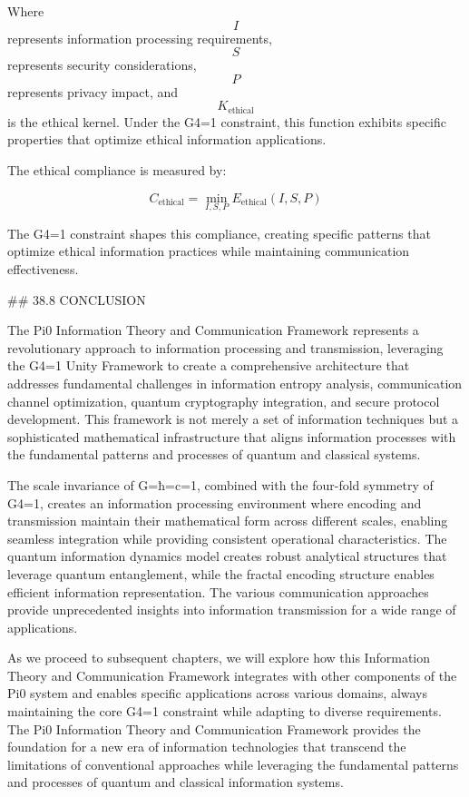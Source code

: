 Where $$ I $$ represents information processing requirements, $$ S $$ represents security considerations, $$ P $$ represents privacy impact, and $$ K_{\text{ethical}} $$ is the ethical kernel. Under the G4=1 constraint, this function exhibits specific properties that optimize ethical information applications.

The ethical compliance is measured by:

$$ C_{\text{ethical}} = \min_{I, S, P} E_{\text{ethical}}(I, S, P) $$

The G4=1 constraint shapes this compliance, creating specific patterns that optimize ethical information practices while maintaining communication effectiveness.

## 38.8 CONCLUSION

The Pi0 Information Theory and Communication Framework represents a revolutionary approach to information processing and transmission, leveraging the G4=1 Unity Framework to create a comprehensive architecture that addresses fundamental challenges in information entropy analysis, communication channel optimization, quantum cryptography integration, and secure protocol development. This framework is not merely a set of information techniques but a sophisticated mathematical infrastructure that aligns information processes with the fundamental patterns and processes of quantum and classical systems.

The scale invariance of G=ħ=c=1, combined with the four-fold symmetry of G4=1, creates an information processing environment where encoding and transmission maintain their mathematical form across different scales, enabling seamless integration while providing consistent operational characteristics. The quantum information dynamics model creates robust analytical structures that leverage quantum entanglement, while the fractal encoding structure enables efficient information representation. The various communication approaches provide unprecedented insights into information transmission for a wide range of applications.

As we proceed to subsequent chapters, we will explore how this Information Theory and Communication Framework integrates with other components of the Pi0 system and enables specific applications across various domains, always maintaining the core G4=1 constraint while adapting to diverse requirements. The Pi0 Information Theory and Communication Framework provides the foundation for a new era of information technologies that transcend the limitations of conventional approaches while leveraging the fundamental patterns and processes of quantum and classical information systems.

